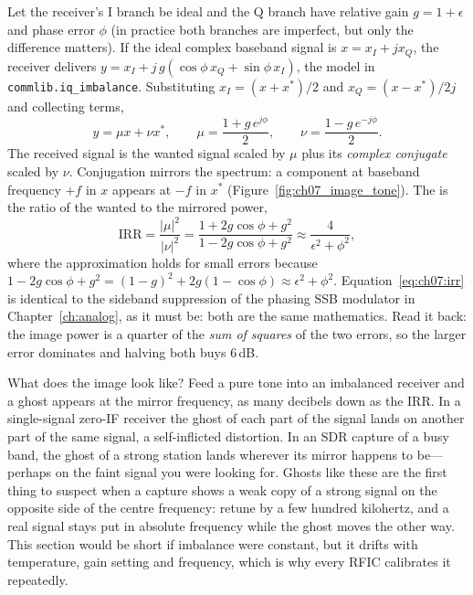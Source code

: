 Let the receiver's I branch be ideal and the Q branch have relative gain $g=1+\epsilon$ and phase error
$\phi$ (in practice both branches are imperfect, but only the difference matters). If the ideal complex
baseband signal is $x=x_I+jx_Q$, the receiver delivers $y=x_I+j\,g(\cos\phi\,x_Q+\sin\phi\,x_I)$, the
model in \texttt{commlib.iq\_imbalance}. Substituting $x_I=(x+x^*)/2$ and $x_Q=(x-x^*)/2j$ and collecting
terms,
\begin{equation}
y=\mu x+\nu x^*,\qquad \mu=\frac{1+g\,e^{j\phi}}{2},\qquad \nu=\frac{1-g\,e^{-j\phi}}{2}.
\label{eq:ch07:iqmodel}
\end{equation}
The received signal is the wanted signal scaled by $\mu$ plus its \emph{complex conjugate} scaled by
$\nu$. Conjugation mirrors the spectrum: a component at baseband frequency $+f$ in $x$ appears at $-f$ in
$x^*$ (Figure~\ref{fig:ch07_image_tone}). The  is the ratio of the wanted to
the mirrored power,
\begin{equation}
\text{IRR}=\frac{|\mu|^2}{|\nu|^2}=\frac{1+2g\cos\phi+g^2}{1-2g\cos\phi+g^2}
\approx\frac{4}{\epsilon^2+\phi^2},
\label{eq:ch07:irr}
\end{equation}
where the approximation holds for small errors because $1-2g\cos\phi+g^2=(1-g)^2+2g(1-\cos\phi)\approx
\epsilon^2+\phi^2$. Equation~\eqref{eq:ch07:irr} is identical to the sideband suppression of the phasing
SSB modulator in Chapter~\ref{ch:analog}, as it must be: both are the same mathematics. Read it back:
the image power is a quarter of the \emph{sum of squares} of the two errors, so the larger error
dominates and halving both buys 6\,dB.


What does the image look like? Feed a pure tone into an imbalanced receiver and a ghost appears at the
mirror frequency, as many decibels down as the IRR. In a single-signal zero-IF receiver the ghost of
each part of the signal lands on another part of the same signal, a self-inflicted distortion. In an SDR
capture of a busy band, the ghost of a strong station lands wherever its mirror happens to be---perhaps on
the faint signal you were looking for. Ghosts like these are the first thing to suspect when a capture
shows a weak copy of a strong signal on the opposite side of the centre frequency: retune by a few
hundred kilohertz, and a real signal stays put in absolute frequency while the ghost moves the other
way. This section would be short if imbalance were constant, but it drifts with
temperature, gain setting and frequency, which is why every RFIC calibrates it repeatedly.

